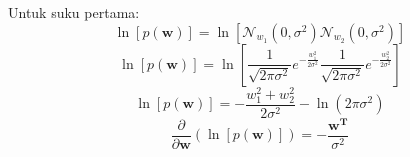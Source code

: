 Untuk suku pertama:
\begin{equation*}
\ln{\left[ p(\mathbf{w}) \right]} = \ln{\left[ \mathcal{N}_{w_1}\left(0,\sigma^2\right)\mathcal{N}_{w_2}\left(0,\sigma^2\right) \right]}
\end{equation*}
\begin{equation*}
\ln{\left[ p(\mathbf{w}) \right]}=\ln{\left[ \frac{1}{\sqrt{2\pi\sigma^2}}e^{-\frac{w_1^2}{2\sigma^2}} \frac{1}{\sqrt{2\pi\sigma^2}}e^{-\frac{w_2^2}{2\sigma^2}} \right]}
\end{equation*}
\begin{equation*}
\ln{\left[ p(\mathbf{w}) \right]}=-\frac{w_1^2+w_2^2}{2\sigma^2}-\ln\left({2\pi\sigma^2}\right)
\end{equation*}
\begin{equation}
\frac{\partial{}}{\partial{\mathbf{w}}}\left(\ln{\left[ p(\mathbf{w}) \right]}\right)=-\frac{\mathbf{w^T}}{\sigma^2} \label{ODE_1st_term}
\end{equation}


